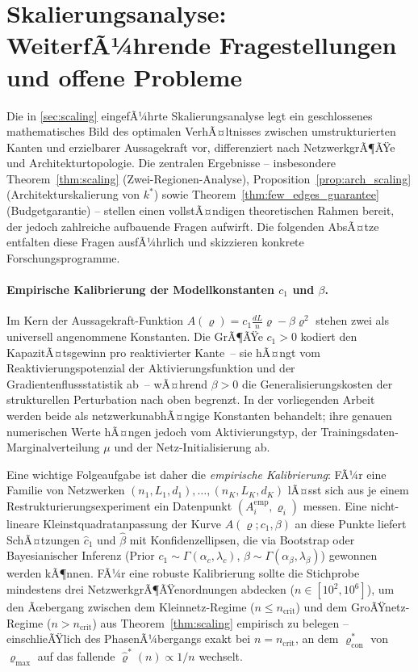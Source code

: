 ﻿\documentclass[12pt, a4paper, openany]{report}
\begin{document}
\section{Skalierungsanalyse: WeiterfÃ¼hrende Fragestellungen und offene Probleme}
\label{sec:outlook_scaling}

Die in \cref{sec:scaling} eingefÃ¼hrte Skalierungsanalyse legt ein geschlossenes
mathematisches Bild des optimalen VerhÃ¤ltnisses zwischen umstrukturierten
Kanten und erzielbarer Aussagekraft vor, differenziert nach NetzwerkgrÃ¶ÃŸe und
Architekturtopologie.  Die zentralen Ergebnisse -- insbesondere
Theorem~\ref{thm:scaling} (Zwei-Regionen-Analyse), Proposition~\ref{prop:arch_scaling}
(Architekturskalierung von $k^*$) sowie Theorem~\ref{thm:few_edges_guarantee}
(Budgetgarantie) -- stellen einen vollstÃ¤ndigen theoretischen Rahmen bereit,
der jedoch zahlreiche auf\-bau\-ende Fragen aufwirft.  Die folgenden AbsÃ¤tze
entfalten diese Fragen ausfÃ¼hrlich und skizzieren konkrete Forschungsprogramme.

\paragraph{Empirische Kalibrierung der Modellkonstanten $c_1$ und $\beta$.}
Im Kern der Aussage\-kraft-Funktion $A(\varrho) = c_1 \frac{dL}{n}\varrho - \beta\varrho^2$
stehen zwei als universell angenommene Konstanten.  Die GrÃ¶ÃŸe $c_1 > 0$
kodiert den KapazitÃ¤tsgewinn pro reaktivierter Kante~-- sie hÃ¤ngt vom
Reaktivierungspotenzial der Aktivierungsfunktion und der Gradientenfluss\-statistik
ab~-- wÃ¤hrend $\beta > 0$ die Generalisierungskosten der strukturellen
Perturbation nach oben begrenzt.  In der vorliegenden Arbeit werden beide
als netzwerkunabhÃ¤ngige Konstanten behandelt; ihre genauen numerischen Werte
hÃ¤ngen jedoch vom Aktivierungstyp, der Trainingsdaten-Marginalverteilung
$\mu$ und der Netz-Initialisierung ab.

Eine wichtige Folgeaufgabe ist daher die \emph{empirische Kalibrierung}:
FÃ¼r eine Familie von Netzwerken $(n_1, L_1, d_1),\ldots,(n_K, L_K, d_K)$
lÃ¤sst sich aus je einem Restrukturierungsexperiment ein Datenpunkt
$(A_i^{\mathrm{emp}}, \varrho_i)$ messen.  Eine nicht-lineare Kleinstquadrat\-anpassung
der Kurve $A(\varrho; c_1, \beta)$ an diese Punkte liefert SchÃ¤tzungen
$\hat{c}_1$ und $\hat\beta$ mit Konfidenzellipsen, die via Bootstrap oder
Bayesianischer Inferenz (Prior $c_1 \sim \Gamma(\alpha_c, \lambda_c)$,
$\beta \sim \Gamma(\alpha_\beta, \lambda_\beta)$) gewonnen werden kÃ¶nnen.
FÃ¼r eine robuste Kalibrierung sollte die Stichprobe mindestens drei
NetzwerkgrÃ¶ÃŸen\-ordnungen abdecken ($n \in [10^2, 10^6]$), um den Ãœbergang
zwischen dem Kleinnetz-Regime ($n \leq n_{\mathrm{crit}}$) und dem
GroÃŸnetz-Regime ($n > n_{\mathrm{crit}}$) aus Theorem~\ref{thm:scaling}
empirisch zu belegen -- einschlieÃŸlich des PhasenÃ¼bergangs exakt bei
$n = n_{\mathrm{crit}}$, an dem $\varrho^*_{\mathrm{con}}$ von $\varrho_{\max}$
auf das fallende $\hat\varrho^*(n) \propto 1/n$ wechselt.
\end{document}
